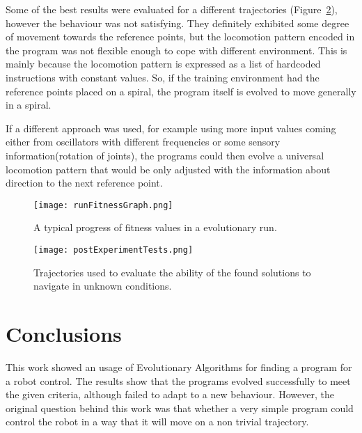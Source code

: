 \documentclass{ExcelAtFIT}
\begin{document}
Some of the best results were evaluated for a different trajectories (Figure~\ref{fig:PostExperimentTests}), however the behaviour was not satisfying.
They definitely exhibited some degree of movement towards the reference points, but the locomotion pattern encoded in the program was not flexible enough to cope with different environment.
This is mainly because the locomotion pattern is expressed as a list of hardcoded instructions with constant values.
So, if the training environment had the reference points placed on a spiral, the program itself is evolved to move generally in a spiral.

If a different approach was used, for example using more input values coming either from oscillators with different frequencies or some sensory information(rotation of joints), the programs could then evolve a universal locomotion pattern that would be only adjusted with the information about direction to the next reference point.

\begin{figure}[t]
	\centering
	{\texttt{[image: runFitnessGraph.png]}}
	\caption{
	A typical progress of fitness values in a evolutionary run.
	}
	\label{fig:FitnessGraph}
\end{figure}

\begin{figure}[t]
	\centering
	{\texttt{[image: postExperimentTests.png]}}
	\caption{
	Trajectories used to evaluate the ability of the found solutions to navigate in unknown conditions.
	}
	\label{fig:PostExperimentTests}
\end{figure}


\section{Conclusions}
\label{sec:Conclusions}

This work showed an usage of Evolutionary Algorithms for finding a program for a robot control.
The results show that the programs evolved successfully to meet the given criteria, although failed to adapt to a new behaviour.
However, the original question behind this work was that whether a very simple program could control the robot in a way that it will move on a non trivial trajectory.
\end{document}
